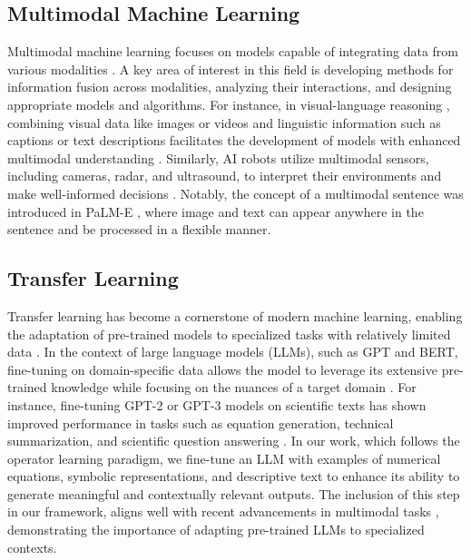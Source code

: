 \subsection{Multimodal Machine Learning}
Multimodal machine learning focuses on models capable of integrating data from various modalities \cite{lu2019vilbert, sun2019videobert, tan2019lxmert,xu2023multimodal}. A key area of interest in this field is developing methods for information fusion across modalities, analyzing their interactions, and designing appropriate models and algorithms. For instance, in visual-language reasoning \cite{tan2019lxmert, sun2019videobert, li2019visualbert}, combining visual data like images or videos and linguistic information such as captions or text descriptions \cite{tan2019lxmert} facilitates the development of models with enhanced multimodal understanding \cite{li2019visualbert}. Similarly, AI robots utilize multimodal sensors, including cameras, radar, and ultrasound, to interpret their environments and make well-informed decisions \cite{feng2020deep, liu2021multimodal}. Notably, the concept of a multimodal sentence was introduced in PaLM-E \cite{driess2023palm}, where image and text can appear anywhere in the sentence and be processed in a flexible manner. 


\subsection{Transfer Learning}
Transfer learning has become a cornerstone of modern machine learning, enabling the adaptation of pre-trained models to specialized tasks with relatively limited data \cite{pan2009survey}. In the context of large language models (LLMs), such as GPT and BERT, fine-tuning on domain-specific data allows the model to leverage its extensive pre-trained knowledge while focusing on the nuances of a target domain \cite{radford2019language, kenton2019bert}. For instance, fine-tuning GPT-2 or GPT-3 models on scientific texts has shown improved performance in tasks such as equation generation, technical summarization, and scientific question answering \cite{brown2020language}. In our work, which follows the operator learning paradigm, we fine-tune an LLM with examples of numerical equations, symbolic representations, and descriptive text to enhance its ability to generate meaningful and contextually relevant outputs. The inclusion of this step in our framework, aligns well with recent advancements in multimodal tasks \cite{han2021pre,liu2024prose,sun2024towards}, demonstrating the importance of adapting pre-trained LLMs to specialized contexts.